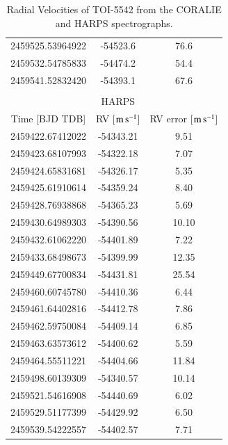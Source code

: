 \documentclass{aa}
\newcommand{\ms}{\mbox{m\,s$^{-1}$}}
\begin{document}
\begin{appendix}
\begin{table}
\begin{tabular}{ccc}
2459525.53964922 & -54523.6  & 76.6 \\ 
2459532.54785833 & -54474.2  & 54.4 \\ 
2459541.52832420 & -54393.1  & 67.6 \\ 
\\
        & HARPS & \\ 
        \hline\hline
        Time [BJD TDB] & RV [$\ms$] & RV error [$\ms$] \\
        \hline
2459422.67412022 & -54343.21  & 9.51 \\ 
2459423.68107993 & -54322.18  & 7.07 \\ 
2459424.65831681 & -54326.17  & 5.35 \\ 
2459425.61910614 & -54359.24  & 8.40 \\ 
2459428.76938868 & -54365.23  & 5.69 \\ 
2459430.64989303 & -54390.56  & 10.10 \\ 
2459432.61062220 & -54401.89  & 7.22 \\ 
2459433.68498673 & -54399.99  & 12.35 \\ 
2459449.67700834 & -54431.81  & 25.54 \\ 
2459460.60745780 & -54410.36  & 6.44 \\ 
2459461.64402816 & -54412.78  & 7.86 \\ 
2459462.59750084 & -54409.14  & 6.85 \\ 
2459463.63573612 & -54400.62  & 5.59 \\ 
2459464.55511221 & -54404.66  & 11.84 \\ 
2459498.60139309 & -54340.57  & 10.14 \\ 
2459521.54616908 & -54440.69  & 6.02 \\ 
2459529.51177399 & -54429.92  & 6.50 \\ 
2459539.54222557 & -54402.57  & 7.71 \\ 

        \hline
        \hline
    \end{tabular}
    \caption{Radial Velocities of TOI-5542 from the CORALIE and HARPS spectrographs.}
    \label{tab:rv}
\end{table}


\end{appendix}
\end{document}
